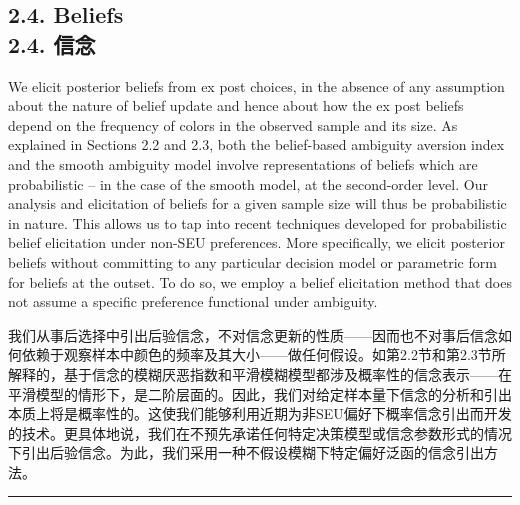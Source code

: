 \documentclass[12pt,a4paper]{article}
\newenvironment{original}
  {\par\vspace{0.5em}\noindent\color{black}\ignorespaces}
  {\par\vspace{0.3em}}
\newenvironment{translation}
  {\par\noindent\color{transblue}\ignorespaces}
  {\par\vspace{0.8em}\hrule\vspace{0.5em}}
\newcommand{\bilingualsubsection}[2]{%
  \subsection{\texorpdfstring{#1 \\[0.2em] {\normalsize\color{transblue}#2}}{#1}}
}
\begin{document}
\bilingualsubsection{2.4. Beliefs}{2.4. 信念}

\begin{original}
We elicit posterior beliefs from ex post choices, in the absence of any assumption about the nature of belief update and hence about how the ex post beliefs depend on the frequency of colors in the observed sample and its size. As explained in Sections 2.2 and 2.3, both the belief-based ambiguity aversion index and the smooth ambiguity model involve representations of beliefs which are probabilistic -- in the case of the smooth model, at the second-order level. Our analysis and elicitation of beliefs for a given sample size will thus be probabilistic in nature. This allows us to tap into recent techniques developed for probabilistic belief elicitation under non-SEU preferences. More specifically, we elicit posterior beliefs without committing to any particular decision model or parametric form for beliefs at the outset. To do so, we employ a belief elicitation method that does not assume a specific preference functional under ambiguity.
\end{original}

\begin{translation}
我们从事后选择中引出后验信念，不对信念更新的性质——因而也不对事后信念如何依赖于观察样本中颜色的频率及其大小——做任何假设。如第2.2节和第2.3节所解释的，基于信念的模糊厌恶指数和平滑模糊模型都涉及概率性的信念表示——在平滑模型的情形下，是二阶层面的。因此，我们对给定样本量下信念的分析和引出本质上将是概率性的。这使我们能够利用近期为非SEU偏好下概率信念引出而开发的技术。更具体地说，我们在不预先承诺任何特定决策模型或信念参数形式的情况下引出后验信念。为此，我们采用一种不假设模糊下特定偏好泛函的信念引出方法。
\end{translation}
\end{document}
